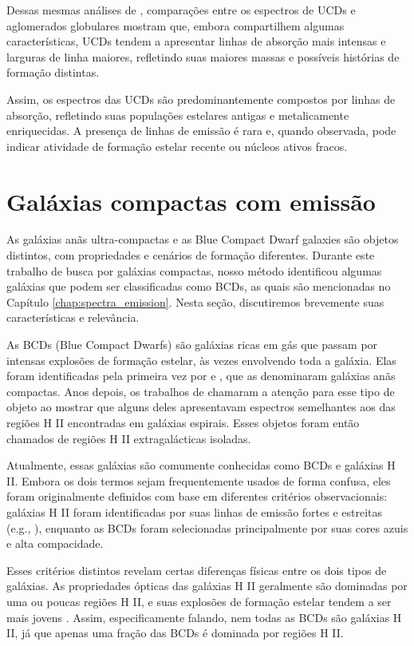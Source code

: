 Dessas mesmas análises de \cite{Mieske_2006}, comparações entre os espectros de UCDs e aglomerados globulares mostram que, embora compartilhem algumas características, UCDs tendem a apresentar linhas de absorção mais intensas e larguras de linha maiores, refletindo suas maiores massas e possíveis histórias de formação distintas.

Assim, os espectros das UCDs são predominantemente compostos por linhas de absorção, refletindo suas populações estelares antigas e metalicamente enriquecidas. A presença de linhas de emissão é rara e, quando observada, pode indicar atividade de formação estelar recente ou núcleos ativos fracos.

\section{Galáxias compactas com emissão}\label{sec:galaxias_compactas_emissao}
As galáxias anãs ultra-compactas e as Blue Compact Dwarf galaxies são objetos distintos, com propriedades e cenários de formação diferentes. Durante este trabalho de busca por galáxias compactas, nosso método identificou algumas galáxias que podem ser classificadas como BCDs, as quais são mencionadas no Capítulo \ref{chap:spectra_emission}. Nesta seção, discutiremos brevemente suas características e relevância.

As BCDs (Blue Compact Dwarfs) são galáxias ricas em gás que passam por intensas explosões de formação estelar, às vezes envolvendo toda a galáxia. Elas foram identificadas pela primeira vez por \cite{Hardie_1956} e \cite{Zwicky_1961}, que as denominaram galáxias anãs compactas. Anos depois, os trabalhos de \cite{Sargent_1970} chamaram a atenção para esse tipo de objeto ao mostrar que alguns deles apresentavam espectros semelhantes aos das regiões H II encontradas em galáxias espirais. Esses objetos foram então chamados de regiões H II extragalácticas isoladas.

Atualmente, essas galáxias são comumente conhecidas como BCDs e galáxias H II. Embora os dois termos sejam frequentemente usados de forma confusa, eles foram originalmente definidos com base em diferentes critérios observacionais: galáxias H II foram identificadas por suas linhas de emissão fortes e estreitas (e.g., \citealt{Terlevich_1991}), enquanto as BCDs foram selecionadas principalmente por suas cores azuis e alta compacidade.

Esses critérios distintos revelam certas diferenças físicas entre os dois tipos de galáxias. As propriedades ópticas das galáxias H II geralmente são dominadas por uma ou poucas regiões H II, e suas explosões de formação estelar tendem a ser mais jovens \citep{Telles_1995}. Assim, especificamente falando, nem todas as BCDs são galáxias H II, já que apenas uma fração das BCDs é dominada por regiões H II.

